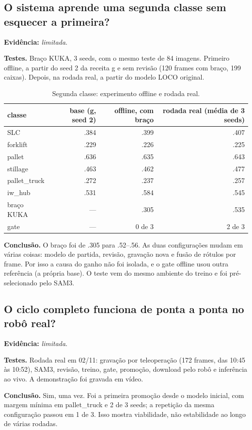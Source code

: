 \documentclass[11pt,a4paper]{article}
\newcommand{\evidencia}[1]{\noindent\textbf{Evidência:} \emph{#1}.\par}
\newcommand{\testes}{\noindent\textbf{Testes.} }
\newcommand{\conclusao}{\noindent\textbf{Conclusão.} }
\begin{document}
\subsection{O sistema aprende uma segunda classe sem esquecer a primeira?}
\evidencia{limitada}

\testes Braço KUKA, 3 seeds, com o mesmo teste de 84 imagens. Primeiro offline,
a partir do seed 2 da receita g e sem revisão (120 frames com braço, 199 caixas).
Depois, na rodada real, a partir do modelo LOCO original.

\begin{table}[H]
\centering\small
\caption{Segunda classe: experimento offline e rodada real.}
\begin{tabular}{lrrr}
\toprule
classe & base (g, seed 2) & offline, com braço & rodada real (média de 3 seeds) \\
\midrule
SLC & .384 & .399 & .407 \\
forklift & .229 & .226 & .225 \\
pallet & .636 & .635 & .643 \\
stillage & .463 & .462 & .477 \\
pallet\_truck & .272 & .237 & .257 \\
iw\_hub & .531 & .584 & .545 \\
braço KUKA & --- & .305 & .535 \\
gate & --- & 0 de 3 & 2 de 3 \\
\bottomrule
\end{tabular}
\end{table}

\conclusao O braço foi de .305 para .52--.56. As duas configurações mudam em
várias coisas: modelo de partida, revisão, gravação nova e fusão de rótulos por
frame. Por isso a causa do ganho não foi isolada, e o gate offline usou outra
referência (a própria base). O teste vem do mesmo ambiente do treino e foi
pré-selecionado pelo SAM3.

\subsection{O ciclo completo funciona de ponta a ponta no robô real?}
\evidencia{limitada}

\testes Rodada real em 02/11: gravação por teleoperação (172 frames, das 10:45
às 10:52), SAM3, revisão, treino, gate, promoção, download pelo robô e inferência
ao vivo. A demonstração foi gravada em vídeo.

\conclusao Sim, uma vez. Foi a primeira promoção desde o modelo inicial, com
margem mínima em pallet\_truck e 2 de 3 seeds; a repetição da mesma configuração
passou em 1 de 3. Isso mostra viabilidade, não estabilidade ao longo de várias
rodadas.
\end{document}
